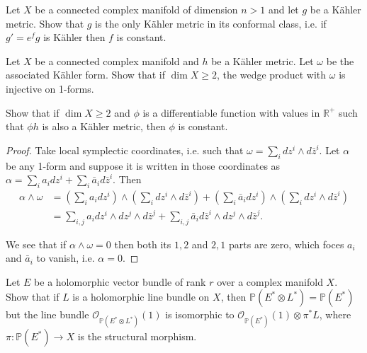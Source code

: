 \documentclass{book}
\begin{document}
\begin{exercise}
\label{exercise-kahler-form-conformal-class}
Let $X$ be a connected complex manifold of
dimension $n>1$
and let $g$ be a Kähler metric.
Show that $g$ is the only Kähler metric in
its conformal class,
i.e. if $g'=e^fg$ is Kähler then $f$ is
constant.
\end{exercise}

\begin{exercise}
\label{exercise-lefsc-injec-1-forms}
Let $X$ be a connected complex manifold and
$h$ be a Kähler metric.
Let $\omega$ be the associated Kähler form.
Show that if $\dim X \geq  2$, the wedge
product with $\omega$
is injective on 1-forms.

Show that if $\dim X \geq  2$ and $\phi$ is a
differentiable
function with values in $\mathbb{R}^+$ such
that $\phi h$ is also
a Kähler metric, then $\phi$ is constant.
\end{exercise}

\begin{proof}
Take local symplectic coordinates, i.e. such
that
$\omega = \sum_idz^i \wedge d \bar{z}^i$.
Let $\alpha$ be any 1-form and suppose it is
written
in those coordinates as
$\alpha=\sum_ia_idz^i +
\sum_i\bar{a}_id\bar{z}^i$.
Then
$$
\begin{aligned}
\alpha\wedge\omega&=
\left(\sum_ia_idz^i\right)
\wedge
\left(\sum_i dz^i \wedge d\bar{z}^i\right)
+
\left(\sum_i \bar{a}_i dz^i\right)
\wedge
\left(\sum_i dz^i \wedge d\bar{z}^i\right)\\
&=
\sum_{i,j}a_i dz^i \wedge dz^j \wedge
d\bar{z}^j
+
\sum_{i,j}\bar{a}_i d\bar{z}^i \wedge dz^j
\wedge d\bar{z}^j.
\end{aligned}
$$

\noindent
We see that if $\alpha \wedge \omega=0$
then both its $1,2$ and $2,1$ parts are zero,
which foces $a_i$ and $\bar{a}_i$ to vanish,
i.e. $\alpha=0$.
\end{proof}
\begin{exercise}
\label{exercise-holom-vecto-bundl-kahle}
\begin{reference}
\cite[Exercise 2, Chapter 3]{voi}
\end{reference}
Let $E$ be a holomorphic vector bundle of
rank $r$
over a complex manifold $X$.
Show that if $L$ is a holomorphic line bundle
on $X$,
then $\mathbb{P}(E^* \otimes L^*)=
\mathbb{P}(E^*)$
but the line bundle
$\mathcal{O}_{\mathbb{P}(E^*\otimes L^*)}(1)$
is isomorphic to
$\mathcal{O}_{\mathbb{P}(E^*)}(1) \otimes
\pi^*L$,
where $\pi:\mathbb{P}(E^*)\to X$ is the
structural morphism.
\end{exercise}
\end{document}

